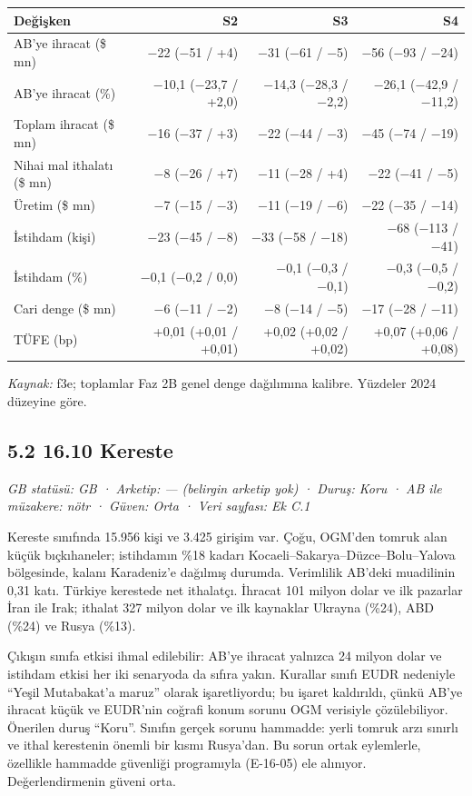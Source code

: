 \begin{longtable}[]{@{}lrrr@{}}
\toprule\noalign{}
\textbf{Değişken} & \textbf{S2} & \textbf{S3} & \textbf{S4} \\
\midrule\noalign{}
\endhead
\bottomrule\noalign{}
\endlastfoot
AB'ye ihracat (\$ mn) & −22 (−51 / +4) & −31 (−61 / −5) & −56 (−93 / −24) \\
AB'ye ihracat (\%) & −10,1 (−23,7 / +2,0) & −14,3 (−28,3 / −2,2) & −26,1 (−42,9 / −11,2) \\
Toplam ihracat (\$ mn) & −16 (−37 / +3) & −22 (−44 / −3) & −45 (−74 / −19) \\
Nihai mal ithalatı (\$ mn) & −8 (−26 / +7) & −11 (−28 / +4) & −22 (−41 / −5) \\
Üretim (\$ mn) & −7 (−15 / −3) & −11 (−19 / −6) & −22 (−35 / −14) \\
İstihdam (kişi) & −23 (−45 / −8) & −33 (−58 / −18) & −68 (−113 / −41) \\
İstihdam (\%) & −0,1 (−0,2 / 0,0) & −0,1 (−0,3 / −0,1) & −0,3 (−0,5 / −0,2) \\
Cari denge (\$ mn) & −6 (−11 / −2) & −8 (−14 / −5) & −17 (−28 / −11) \\
TÜFE (bp) & +0,01 (+0,01 / +0,01) & +0,02 (+0,02 / +0,02) & +0,07 (+0,06 / +0,08) \\
\end{longtable}

\endgroup

\emph{Kaynak:} \etiketT{} f3e; toplamlar Faz 2B genel denge dağılımına kalibre. Yüzdeler 2024 düzeyine göre.

\hypertarget{nace_kartlar_16-18-52-1610-kereste}{%
\subsection{5.2 16.10 Kereste}\label{nace_kartlar_16-18-52-1610-kereste}}

\emph{GB statüsü: GB · Arketip: --- (belirgin arketip yok) · Duruş: Koru · AB ile müzakere: nötr · Güven: Orta · Veri sayfası: Ek C.1}

Kereste sınıfında 15.956 kişi ve 3.425 girişim var. Çoğu, OGM'den tomruk alan küçük bıçkıhaneler; istihdamın \%18 kadarı Kocaeli--Sakarya--Düzce--Bolu--Yalova bölgesinde, kalanı Karadeniz'e dağılmış durumda. Verimlilik AB'deki muadilinin 0,31 katı. Türkiye kerestede net ithalatçı. İhracat 101 milyon dolar ve ilk pazarlar İran ile Irak; ithalat 327 milyon dolar ve ilk kaynaklar Ukrayna (\%24), ABD (\%24) ve Rusya (\%13).

Çıkışın sınıfa etkisi ihmal edilebilir: AB'ye ihracat yalnızca 24 milyon dolar ve istihdam etkisi her iki senaryoda da sıfıra yakın. Kurallar sınıfı EUDR nedeniyle ``Yeşil Mutabakat'a maruz'' olarak işaretliyordu; bu işaret kaldırıldı, çünkü AB'ye ihracat küçük ve EUDR'nin coğrafi konum sorunu OGM verisiyle çözülebiliyor. Önerilen duruş ``Koru''. Sınıfın gerçek sorunu hammadde: yerli tomruk arzı sınırlı ve ithal kerestenin önemli bir kısmı Rusya'dan. Bu sorun ortak eylemlerle, özellikle hammadde güvenliği programıyla (E-16-05) ele alınıyor. Değerlendirmenin güveni orta.

